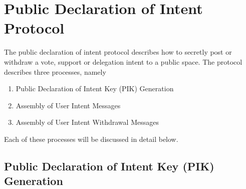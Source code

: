 %
%
%
%
%


\section{Public Declaration of Intent Protocol}
\label{sec:PublicDeclarationOfIntentProtocol}
The public declaration of intent protocol describes how to secretly post or withdraw a vote, support or delegation intent to a public space.
The protocol describes three processes, namely
\begin{enumerate}
  \item Public Declaration of Intent Key (PIK) Generation
  \item Assembly of User Intent Messages
  \item Assembly of User Intent Withdrawal Messages
\end{enumerate}

Each of these processes will be discussed in detail below.

\subsection{Public Declaration of Intent Key (PIK) Generation}

